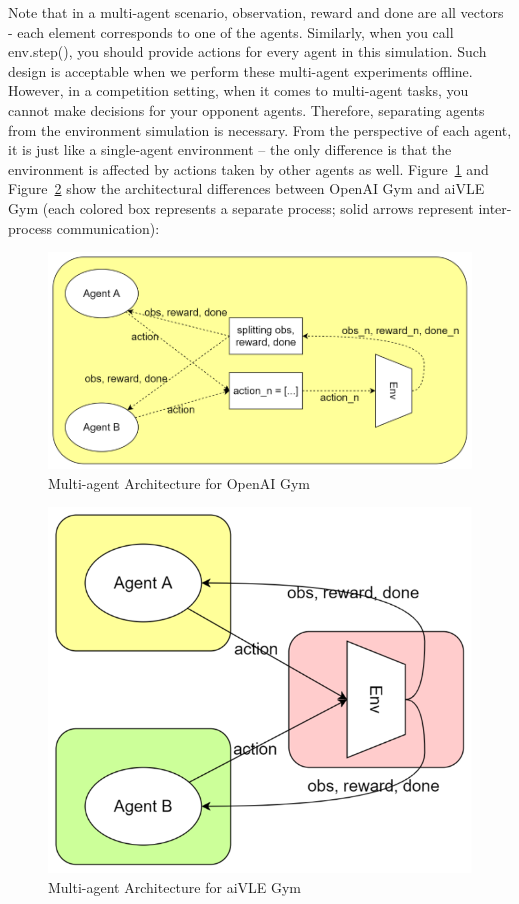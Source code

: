 \documentclass[fyp]{socreport}
\begin{document}
Note that in a multi-agent scenario, observation, reward and done are all vectors - each element corresponds to one of the agents. Similarly, when you call env.step(), you should provide actions for every agent in this simulation. Such design is acceptable when we perform these multi-agent experiments offline. However, in a competition setting, when it comes to multi-agent tasks, you cannot make decisions for your opponent agents. Therefore, separating agents from the environment simulation is necessary. From the perspective of each agent, it is just like a single-agent environment – the only difference is that the environment is affected by actions taken by other agents as well. Figure~\ref{fig:opanai-gym-multi-arch} and Figure~\ref{fig:aivle-gym-multi-arch} show the architectural differences between OpenAI Gym and aiVLE Gym (each colored box represents a separate process; solid arrows represent inter-process communication):
\begin{figure}[H]
    \centering
    \includegraphics{images/opanai-gym-multi-arch.png}
    \caption{Multi-agent Architecture for OpenAI Gym}
    \label{fig:opanai-gym-multi-arch}
\end{figure}
\begin{figure}[H]
    \centering
    \includegraphics{images/aivle-gym-multi-arch.png}
    \caption{Multi-agent Architecture for aiVLE Gym}
    \label{fig:aivle-gym-multi-arch}
\end{figure}
\end{document}
